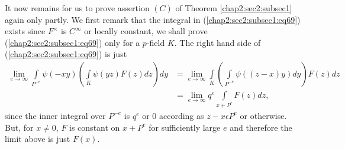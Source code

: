  It now remains for us to prove assertion $(C)$ of
 Theorem \ref{chap2:sec2:subsec1} again
 only partly. We first remark that the integral in (\ref{chap2:sec2:subsec1:eq69}) exists since
 $F^{\times}$ is $C^{\infty}$ or locally constant, we shall prove
 (\ref{chap2:sec2:subsec1:eq69}) 
 only for a $p$-field $K$. The right hand side of
 (\ref{chap2:sec2:subsec1:eq69}) is just 
 \begin{align*}
 \lim\limits_{e\rightarrow \infty}
 \int\limits_{P^{-e}}\psi(-xy)\left(\int\limits_{K}\psi(yz)F(z)dz\right)dy
 & =\lim\limits_{e\rightarrow
   \infty}\int\limits_{K}\left(\int\limits_{P^{-e}}\psi((z-x)y)dy\right)F(z)dz\\
 & =\lim\limits_{e\rightarrow \infty}q^{e}\int\limits_{x+P^{e}}F(z)dz,
 \end{align*}
 since the inner integral over $P^{-e}$ is $q^{e}$ or $0$ according
 as $z-x\epsilon P^{e}$ or otherwise. But, for $x\neq 0$, $F$ is
 constant on $x+P^{e}$ for sufficiently large $e$ and therefore the
 limit above is just $F(x)$.

